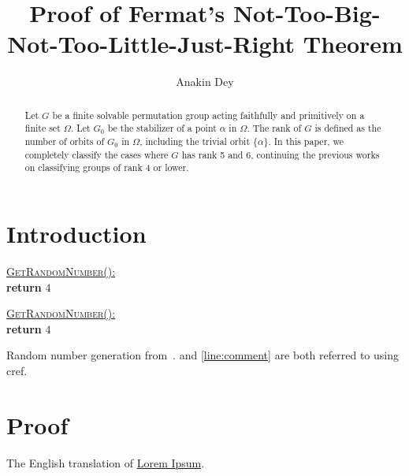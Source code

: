 \documentclass[letterpaper]{amsart}
\title{Proof of Fermat's Not-Too-Big-Not-Too-Little-Just-Right Theorem}
\author{Anakin Dey}
\begin{document}
\begin{abstract}
    Let $G$ be a finite solvable permutation group acting faithfully and primitively on a finite set $\Omega$. 
    Let $G_0$ be the stabilizer of a point $\alpha$ in $\Omega$.
    The rank of $G$ is defined as the number of orbits of $G_0$ in $\Omega$, including the trivial orbit $\{\alpha\}$. 
    In this paper, we completely classify the cases where $G$ has rank 5 and 6, continuing the previous works on classifying groups of rank 4 or lower.
\end{abstract}

\maketitle

\section{Introduction}\label{sec: intro}

\begin{algo}[1.3]
    \underline{\textsc{GetRandomNumber}():}\+
\\      \textbf{return} $4$   
\\      \hspace{39.00pt}
\end{algo}

\begin{nalgo}
                    \underline{\textsc{GetRandomNumber}():}\+
\\\label{line:ret}      \textbf{return} $4$   
\\\label{line:comment}  \hspace{39.00pt}
\end{nalgo}

Random number generation from~\cite{site:xkcd}.  and \cref{line:comment} are both referred to using cref.


\section*{Proof}
The English translation of \href{https://en.wikipedia.org/wiki/Lorem_ipsum#Source_text}{Lorem Ipsum}.
\end{document}
